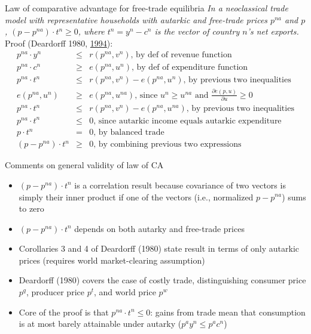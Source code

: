 \documentclass[11pt,notes=hide,aspectratio=169]{beamer}
\begin{document}
\begin{frame}{Law of comparative advantage for free-trade equilibria}
\textit{In a neoclassical trade model with representative households
with autarkic and free-trade prices $p^{na}$ and $p$, 
$\left(p-p^{na}\right) \cdot t^{n} \geq 0$, 
where $t^{n}=y^{n}-c^{n}$ is the vector of country $n$'s net exports.}
\hfill Proof (Deardorff 1980, \href{https://www.jstor.org/stable/40440263}{1994}):
\begin{eqnarray*}
p^{na}\cdot y^{n} &\leq &r\left( p^{na},v^{n}\right) \text{, \ \ by def of revenue function} \\
p^{na}\cdot c^{n} &\geq &e\left( p^{na},u^{n}\right) \text{, \ \ by def of expenditure function} \\
p^{na}\cdot t^{n} &\leq &r\left( p^{na},v^{n}\right) -e\left( p^{na},u^{n}\right) \text{, \ \ by previous two inequalities} \\
e\left( p^{na},u^{n}\right) &\geq &e\left( p^{na},u^{na}\right) \text{,
since }u^{n}\geq u^{na}\text{ and } \frac{\partial e\left( p,u\right)}{\partial u} \geq 0 \\
p^{na}\cdot t^{n} &\leq &r\left( p^{na},v^{n}\right) -e\left(
p^{na},u^{na}\right) \text{, by previous two inequalities} \\
p^{na}\cdot t^{n} &\leq &0\text{, since autarkic income equals autarkic expenditure}
\\
p \cdot t^{n} &=&0\text{, by balanced trade} \\
\left( p-p^{na}\right) \cdot t^{n} &\geq &0\text{, by combining previous two expressions }
\end{eqnarray*}
\end{frame}
\begin{frame}{Comments on general validity of law of CA}
\begin{itemize}
	\item $\left(p-p^{na}\right) \cdot t^{n}$ is a correlation result because covariance of two vectors is simply their inner product if one of the vectors (i.e., normalized $p-p^{na}$) sums to zero
	\item $\left(p-p^{na}\right) \cdot t^{n}$ depends on both autarky and free-trade prices
	\item Corollaries 3 and 4 of Deardorff (1980) state result in terms of only autarkic prices (requires world market-clearing assumption)
	\item Deardorff (1980) covers the case of costly trade, distinguishing	 consumer price $p^q$, producer price $p^t$, and world price $p^w$
	\item Core of the proof is that $p^{na} \cdot t^n \leq 0$: gains from trade mean that consumption is at most barely attainable under autarky ($p^a y^n \leq p^a c^n$) 
\end{itemize}
\end{frame}
\end{document}
